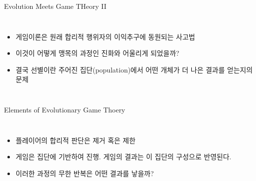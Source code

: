 \documentclass[final]{beamer}
\begin{document}
\begin{frame}[t]{Evolution Meets Game THeory II}
	\begin{columns}[c]
		\column{15em}
		\begin{itemize}
			\item 게임이론은 원래 합리적 행위자의 이익추구에 동원되는 사고법
			\item 이것이 어떻게 맹목의 과정인 진화와 어울리게 되었을까?
			\item 결국 선별이란 주어진 집단(population)에서 어떤 개체가 더 나은 결과를 얻는지의 문제 
		\end{itemize}
		\column{15em}
	\end{columns}
\end{frame}

\begin{frame}[t]{Elements of Evolutionary Game Thoery}
	\begin{columns}[c]
		\column{15em}
		\begin{itemize}
			\item 플레이어의 합리적 판단은 제거 혹은 제한 
			\item 게임은 집단에 기반하여 진행. 게임의 결과는 이 집단의 구성으로 반영된다.  
			\item 이러한 과정의 무한 반복은 어떤 결과를 낳을까? 
		\end{itemize}
		\column{15em}
		\hspace{-1em}
	\end{columns}
\end{frame}
\end{document}
